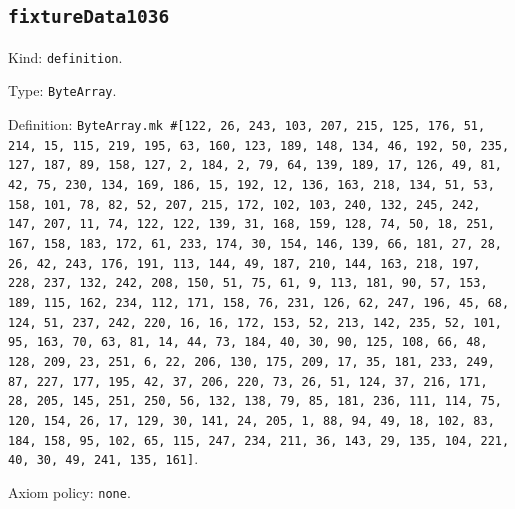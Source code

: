 \documentclass[11pt]{article}
\begin{document}
\subsection*{\texttt{fixtureData1036}}
\noindent Kind: \texttt{definition}.\par
\noindent Type: \texttt{ByteArray}.\par
\noindent Definition: \texttt{ByteArray.mk \#[122, 26, 243, 103, 207, 215, 125, 176, 51, 214, 15, 115, 219, 195, 63, 160, 123, 189, 148, 134, 46, 192, 50, 235, 127, 187, 89, 158, 127, 2, 184, 2, 79, 64, 139, 189, 17, 126, 49, 81, 42, 75, 230, 134, 169, 186, 15, 192, 12, 136, 163, 218, 134, 51, 53, 158, 101, 78, 82, 52, 207, 215, 172, 102, 103, 240, 132, 245, 242, 147, 207, 11, 74, 122, 122, 139, 31, 168, 159, 128, 74, 50, 18, 251, 167, 158, 183, 172, 61, 233, 174, 30, 154, 146, 139, 66, 181, 27, 28, 26, 42, 243, 176, 191, 113, 144, 49, 187, 210, 144, 163, 218, 197, 228, 237, 132, 242, 208, 150, 51, 75, 61, 9, 113, 181, 90, 57, 153, 189, 115, 162, 234, 112, 171, 158, 76, 231, 126, 62, 247, 196, 45, 68, 124, 51, 237, 242, 220, 16, 16, 172, 153, 52, 213, 142, 235, 52, 101, 95, 163, 70, 63, 81, 14, 44, 73, 184, 40, 30, 90, 125, 108, 66, 48, 128, 209, 23, 251, 6, 22, 206, 130, 175, 209, 17, 35, 181, 233, 249, 87, 227, 177, 195, 42, 37, 206, 220, 73, 26, 51, 124, 37, 216, 171, 28, 205, 145, 251, 250, 56, 132, 138, 79, 85, 181, 236, 111, 114, 75, 120, 154, 26, 17, 129, 30, 141, 24, 205, 1, 88, 94, 49, 18, 102, 83, 184, 158, 95, 102, 65, 115, 247, 234, 211, 36, 143, 29, 135, 104, 221, 40, 30, 49, 241, 135, 161]}.\par
\noindent Axiom policy: \texttt{none}.\par
\end{document}
